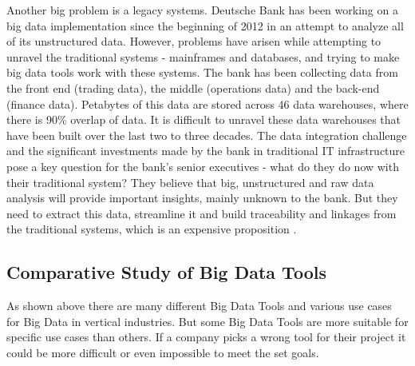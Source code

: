 \documentclass[runningheads]{llncs}
\begin{document}
\begin{enumerate}
Another big problem is a legacy systems. Deutsche Bank has been working on a big data implementation since the beginning of 2012 in an attempt to analyze all of its unstructured data. However, problems have arisen while attempting to unravel the traditional systems - mainframes and databases, and trying to make big data tools work with these systems. The bank has been collecting data from the front end (trading data), the middle (operations data) and the back-end (finance data). Petabytes of this data are stored across 46 data warehouses, where there is 90\% overlap of data. It is difficult to unravel these data warehouses that have been built over the last two to three decades. The data integration challenge and the significant investments made by the bank in traditional IT infrastructure pose a key question for the bank’s senior executives - what do they do now with their traditional system? They believe that big, unstructured and raw data analysis will provide important insights, mainly unknown to the bank. But they need to extract this data, streamline it and build traceability and linkages from the traditional systems, which is an expensive proposition \cite{PREEZ}.

\end{enumerate}

\subsection{Comparative Study of Big Data Tools}
As shown above there are many different Big Data Tools and various use cases for Big Data in vertical industries. But some Big Data Tools are more suitable for specific use cases than others. If a company picks a wrong tool for their project it could be more difficult or even impossible to meet the set goals.
\end{document}
